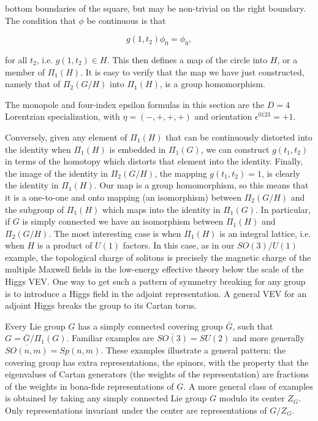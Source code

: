 bottom boundaries of the square, but may be non-trivial on the right boundary.
The condition that $\phi$ be continuous is that

\[
  g(1,t_2)\phi_0=\phi_0,
\]

for all $t_2$, i.e. $g(1,t_2)\in H$. This then defines a map of the circle into
$H$, or a member of $\Pi_1(H)$. It is easy to verify that the map we have just
constructed, namely that of $\Pi_2(G/H)$ into $\Pi_1(H)$, is a group
homomorphism.

The monopole and four-index epsilon formulas in this section are the $D=4$
Lorentzian specialization, with $\eta=(-,+,+,+)$ and orientation
$\epsilon^{0123}=+1$.

Conversely, given any element of $\Pi_1(H)$ that can be continuously distorted
into the identity when $\Pi_1(H)$ is embedded in $\Pi_1(G)$, we can construct
$g(t_1,t_2)$ in terms of the homotopy which distorts that element into the
identity. Finally, the image of the identity in $\Pi_2(G/H)$, the mapping
$g(t_1,t_2)=1$, is clearly the identity in $\Pi_1(H)$. Our map is a group
homomorphism, so this means that it is a one-to-one and onto mapping (an
isomorphism) between $\Pi_2(G/H)$ and the subgroup of $\Pi_1(H)$ which maps
into the identity in $\Pi_1(G)$. In particular, if $G$ is simply connected we
have an isomorphism between $\Pi_1(H)$ and $\Pi_2(G/H)$. The most interesting
case is when $\Pi_1(H)$ is an integral lattice, i.e. when $H$ is a product of
$U(1)$ factors. In this case, as in our $SO(3)/U(1)$ example, the topological
charge of solitons is precisely the magnetic charge of the multiple Maxwell
fields in the low-energy effective theory below the scale of the Higgs VEV. One
way to get such a pattern of symmetry breaking for any group is to introduce a
Higgs field in the adjoint representation. A general VEV for an adjoint Higgs
breaks the group to its Cartan torus.

Every Lie group $G$ has a simply connected covering group $\bar G$, such that
$G=\bar G/\Pi_1(G)$. Familiar examples are $\overline{SO(3)}=SU(2)$ and more
generally $\overline{SO(n,m)}=Sp(n,m)$. These examples illustrate a general
pattern: the covering group has extra representations, the spinors, with the
property that the eigenvalues of Cartan generators (the weights of the
representation) are fractions of the weights in bona-fide representations of
$G$. A more general class of examples is obtained by taking any simply
connected Lie group $G$ modulo its center $Z_G$. Only representations invariant
under the center are representations of $G/Z_G$.

